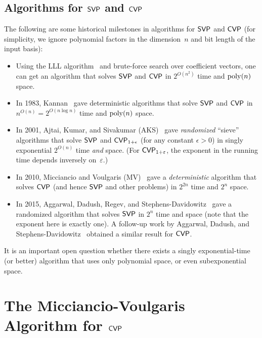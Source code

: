 \documentclass[11pt]{article}
\begin{document}
\subsection{Algorithms for $\mathsf{SVP}$ and $\mathsf{CVP}$}
\label{sec:algorithms-svp-cvp}

The following are some historical milestones in algorithms for $\mathsf{SVP}$
and $\mathsf{CVP}$ (for simplicity, we ignore polynomial factors in the
dimension~$n$ and bit length of the input basis):
\begin{itemize}[itemsep=0pt]
\item Using the LLL algorithm~\cite{lenstra82:_factor} and brute-force
  search over coefficient vectors, one can get an algorithm that
  solves $\mathsf{SVP}$ and $\mathsf{CVP}$ in $2^{O(n^{2})}$ time and $\operatorname{poly}(n)$
  space.
\item In 1983, Kannan~\cite{DBLP:conf/stoc/Kannan83} gave
  deterministic algorithms that solve $\mathsf{SVP}$ and $\mathsf{CVP}$ in
  $n^{O(n)} = 2^{O(n \log n)}$ time and $\operatorname{poly}(n)$ space.
\item In 2001, Ajtai, Kumar, and Sivakumar
  (AKS)~\cite{DBLP:conf/stoc/AjtaiKS01} gave \emph{randomized}
  ``sieve'' algorithms that solve $\mathsf{SVP}$ and $\mathsf{CVP}_{1+\epsilon}$ (for
  any constant $\epsilon > 0$) in singly exponential $2^{O(n)}$ time
  \emph{and} space. (For $\mathsf{CVP}_{1+\varepsilon}$, the exponent in the
  running time depends inversely on~$\varepsilon$.)
\item In 2010, Micciancio and Voulgaris
  (MV)~\cite{DBLP:conf/stoc/MicciancioV10} gave a \emph{deterministic}
  algorithm that solves $\mathsf{CVP}$ (and hence $\mathsf{SVP}$ and other problems)
  in $2^{2n}$ time and $2^{n}$ space.
\item In 2015, Aggarwal, Dadush, Regev, and
  Stephens-Davidowitz~\cite{DBLP:conf/stoc/AggarwalDRS15} gave a
  randomized algorithm that solves $\mathsf{SVP}$ in $2^{n}$ time and space
  (note that the exponent here is exactly one). A follow-up work by
  Aggarwal, Dadush, and
  Stephens-Davidowitz~\cite{DBLP:conf/focs/AggarwalDS15} obtained a
  similar result for $\mathsf{CVP}$.
\end{itemize}
It is an important open question whether there exists a singly
exponential-time (or better) algorithm that uses only polynomial
space, or even subexponential space.

\section{The Micciancio-Voulgaris Algorithm for $\mathsf{CVP}$}
\label{sec:mv-alg}
\end{document}
